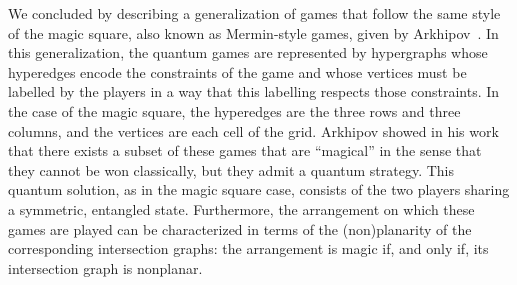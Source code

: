 \documentclass{llncs}
\begin{document}
We concluded by describing a generalization of games that follow the same
style of the magic square, also known as Mermin-style games, given by
Arkhipov~\cite{arkhipov:2012}. In this generalization, the quantum
games are represented by hypergraphs whose hyperedges encode the
constraints of the game and whose vertices must be labelled by the
players in a way that this labelling respects those constraints. In the
case of the magic square, the hyperedges are the three rows and three
columns, and the vertices are each cell of the grid. Arkhipov showed
in his work that there exists a subset of these games that are
``magical'' in the sense that they cannot be won classically, but they
admit a quantum strategy. This quantum solution, as in the magic
square case, consists of the two players sharing a symmetric,
entangled state. Furthermore, the arrangement on which these games are
played can be characterized in terms of the (non)planarity of the
corresponding intersection graphs: the arrangement is magic if, and
only if, its intersection graph is nonplanar.


\printbibliography{}
\end{document}
